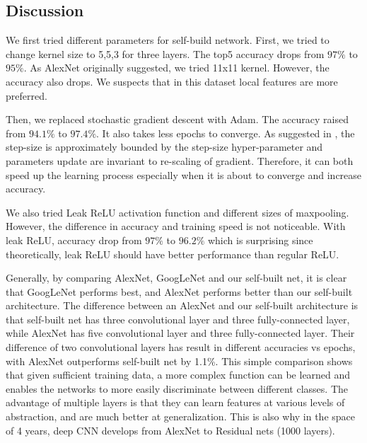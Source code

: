 \documentclass{article} %
\begin{document}
\subsection{Discussion}
We first tried different parameters for self-build network. First, we tried to change kernel
size to 5,5,3 for three layers. The top5 accuracy drops from $97\%$ to $95\%$. As AlexNet originally 
suggested, we tried 11x11 kernel. However, the accuracy also drops. We suspects that in this dataset
local features are more preferred. \

Then, we replaced stochastic gradient descent with Adam. The accuracy raised from $94.1\%$ to $97.4\%$. It also takes less epochs to converge. As suggested in \cite{adam}, the step-size is approximately bounded by the step-size hyper-parameter and parameters update are invariant to re-scaling of gradient. Therefore, it can both speed up the learning process especially when it is about to converge and increase accuracy. \

We also tried Leak ReLU activation function and different sizes of maxpooling. However, the difference in accuracy and training speed is not noticeable. With leak ReLU, accuracy drop from $97\%$ to $96.2\%$ which is surprising since theoretically, leak ReLU should have better performance than regular ReLU.  

Generally, by comparing AlexNet, GoogLeNet and our self-built net, it is clear that GoogLeNet performs best, and AlexNet performs better than our self-built architecture. The difference between an AlexNet and our self-built architecture is that self-built net has three convolutional layer and three fully-connected layer, while AlexNet has five convolutional layer and three fully-connected layer. Their difference of two convolutional layers has result in different accuracies vs epochs, with AlexNet outperforms self-built net by 1.1\%. This simple comparison shows that given sufficient training data, a more complex function can be learned and enables the networks to more easily discriminate between different classes. The advantage of multiple layers is that they can learn features at various levels of abstraction, and are much better at generalization. This is also why in the space of 4 years, deep CNN develops from AlexNet to Residual nets (1000 layers).
\end{document}
